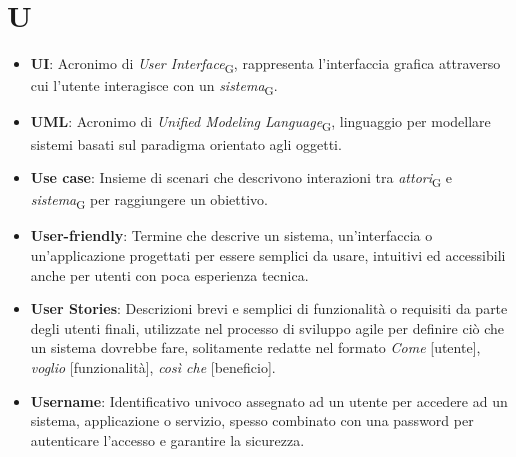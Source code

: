 \section{U}
\begin{itemize}
    \item \textbf{UI}: Acronimo di \textit{User Interface}\textsubscript{G}, rappresenta l'interfaccia grafica attraverso cui l'utente interagisce con un \textit{sistema}\textsubscript{G}.
    \item \textbf{UML}: Acronimo di \textit{Unified Modeling Language}\textsubscript{G}, linguaggio per modellare sistemi basati sul paradigma orientato agli oggetti.
    \item \textbf{Use case}: Insieme di scenari che descrivono interazioni tra \textit{attori}\textsubscript{G} e \textit{sistema}\textsubscript{G} per raggiungere un obiettivo.
    \item \textbf{User-friendly}: Termine che descrive un sistema, un'interfaccia o un'applicazione progettati per essere semplici da usare, intuitivi ed accessibili anche per utenti con poca esperienza tecnica.
    \item \textbf{User Stories}: Descrizioni brevi e semplici di funzionalità o requisiti da parte degli utenti finali, utilizzate nel processo di sviluppo agile per definire ciò che un sistema dovrebbe fare, solitamente redatte nel formato \textit{Come} [utente], \textit{voglio} [funzionalità], \textit{così che} [beneficio].
    \item \textbf{Username}: Identificativo univoco assegnato ad un utente per accedere ad un sistema, applicazione o servizio, spesso combinato con una password per autenticare l'accesso e garantire la sicurezza.
\end{itemize}
